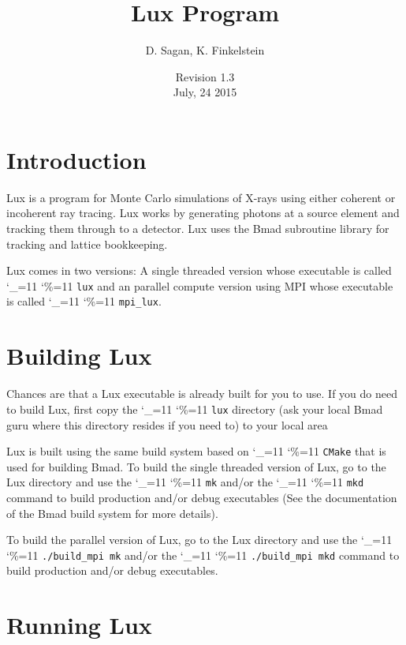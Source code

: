 \documentclass[11pt]{article}
\title{Lux Program}
\author{D. Sagan, K. Finkelstein}
\date{Revision 1.3 \\ July, 24 2015}
\newcommand{\lux}{Lux\xspace}
\newcommand\ttcmd{\begingroup\catcode`\_=11 \catcode`\%=11 \dottcmd}
\newcommand\dottcmd[1]{\texttt{#1}\endgroup}
\newcommand{\vn}{\ttcmd}
\begin{document}
\maketitle

\tableofcontents

\section{Introduction} 
\label{s:intro}

\lux is a program for Monte Carlo simulations of X-rays using either
coherent or incoherent ray tracing. \lux works by generating
photons at a source element and tracking them through to a
detector. \lux uses the Bmad subroutine library\cite{b:bmad} for
tracking and lattice bookkeeping.

\lux comes in two versions: A single threaded version whose executable
is called \vn{lux} and an parallel compute version using MPI whose
executable is called \vn{mpi_lux}.

\section{Building \lux} 
\label{s:build}

Chances are that a \lux executable is already built for you to use. If
you do need to build \lux, first copy the \vn{lux} directory (ask your
local Bmad guru where this directory resides if you need to) to your
local area 

\lux is built using the same build system based on \vn{CMake} that is
used for building Bmad. To build the single threaded version of \lux,
go to the \lux directory and use the \vn{mk} and/or the \vn{mkd}
command to build production and/or debug executables (See the
documentation of the Bmad build system for more details).

To build the parallel version of \lux, go to the \lux directory and
use the \vn{./build_mpi mk} and/or the \vn{./build_mpi mkd} command to
build production and/or debug executables.

\section{Running \lux} 
\label{s:run}
\end{document}
